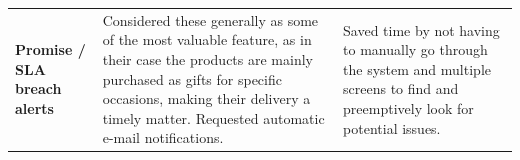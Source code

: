 \documentclass{imc-inf}
\begin{document}
\begin{longtable}{@{}>{\raggedright\arraybackslash}p{3cm}p{5.75cm}p{5.75cm}@{}}
  \textbf{Promise / SLA breach alerts}                                                                                                                                                                                                                                                                                                                                                                                                                                                                                                                                                                                                                                                                                                                                                                                                                                                                         &
  Considered these generally as some of the most valuable feature, as in their case the products are mainly purchased as gifts for specific occasions, making their delivery a timely matter. Requested automatic e-mail notifications.                                                                                                                                                                                                                                                                                                                                                                                                                                                                                                                                                                                                                                                                        &
  Saved time by not having to manually go through the system and multiple screens to find and preemptively look for potential issues.                                                                                                                                                                                                                                                                                                                                                                                                                                                                                                                                                                                                                                                                                                                                                                                                                      \\[6pt]


\end{longtable}
\end{document}
